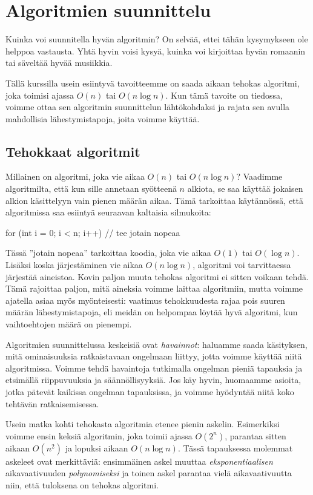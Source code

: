 \chapter{Algoritmien suunnittelu}

Kuinka voi suunnitella hyvän algoritmin?
On selvää, ettei tähän kysymykseen ole helppoa vastausta.
Yhtä hyvin voisi kysyä, kuinka voi kirjoittaa hyvän romaanin
tai säveltää hyvää musiikkia.

Tällä kurssilla usein esiintyvä tavoitteemme on
saada aikaan tehokas algoritmi, joka toimisi ajassa $O(n)$ tai $O(n \log n)$.
Kun tämä tavoite on tiedossa, voimme ottaa sen algoritmin
suunnittelun lähtökohdaksi ja rajata sen avulla mahdollisia
lähestymistapoja, joita voimme käyttää.

\section{Tehokkaat algoritmit}

Millainen on algoritmi, joka vie aikaa $O(n)$ tai $O(n \log n)$?
Vaadimme algoritmilta,
että kun sille annetaan syötteenä $n$ alkiota,
se saa käyttää jokaisen alkion käsittelyyn
vain pienen määrän aikaa.
Tämä tarkoittaa käytännössä, että algoritmissa saa
esiintyä seuraavan kaltaisia silmukoita:

\begin{code}
for (int i = 0; i < n; i++) {
    // tee jotain nopeaa
}
\end{code}

Tässä ''jotain nopeaa'' tarkoittaa koodia, joka vie aikaa
$O(1)$ tai $O(\log n)$.
Lisäksi koska järjestäminen vie aikaa $O(n \log n)$,
algoritmi voi tarvittaessa järjestää aineistoa.
Kovin paljon muuta tehokas algoritmi ei sitten voikaan tehdä.
Tämä rajoittaa paljon, mitä aineksia voimme laittaa algoritmiin,
mutta voimme ajatella asiaa myös myönteisesti:
vaatimus tehokkuudesta rajaa pois suuren määrän lähestymistapoja,
eli meidän on helpompaa löytää hyvä algoritmi,
kun vaihtoehtojen määrä on pienempi.

Algoritmien suunnittelussa keskeisiä ovat \emph{havainnot}:
haluamme saada käsityksen,
mitä ominaisuuksia ratkaistavaan ongelmaan liittyy,
jotta voimme käyttää niitä algoritmissa.
Voimme tehdä havaintoja tutkimalla ongelman pieniä tapauksia
ja etsimällä riippuvuuksia ja säännöllisyyksiä.
Jos käy hyvin, huomaamme asioita, jotka pätevät kaikissa ongelman
tapauksissa, ja voimme hyödyntää niitä koko tehtävän ratkaisemisessa.

Usein matka kohti tehokasta algoritmia etenee pienin askelin.
Esimerkiksi voimme ensin keksiä algoritmin, joka toimii ajassa $O(2^n)$,
parantaa sitten aikaan $O(n^2)$ ja lopuksi aikaan $O(n \log n)$.
Tässä tapauksessa molemmat askeleet ovat merkittäviä:
ensimmäinen askel muuttaa \emph{eksponentiaalisen} aikavaativuuden
\emph{polynomiseksi} ja toinen askel parantaa vielä aikavaativuutta niin,
että tuloksena on tehokas algoritmi.

